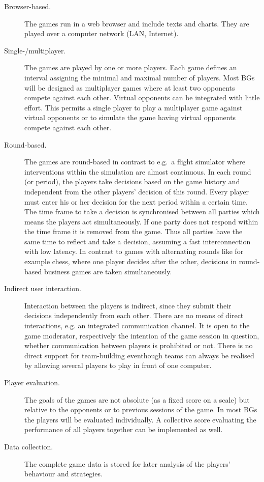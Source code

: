 \begin{description}
    \item[Browser-based.] The games run in a web browser and include texts and charts. They are played over a computer network (LAN, Internet).
    \item[Single-/multiplayer.] The games are played by one or more players. Each game defines an interval assigning the minimal and maximal number of players. Most BGs will be designed as multiplayer games where at least two opponents compete against each other. Virtual opponents can be integrated with little effort. This permits a single player to play a multiplayer game against virtual opponents or to simulate the game having virtual opponents compete against each other.
    \item[Round-based.] The games are round-based in contrast to e.g.~a flight simulator where interventions within the simulation are almost continuous. 
    In each round (or period), the players take decisions based on the game history and independent from the other players' decision of this round. Every player must enter his or her decision for the next period within a certain time. 
    The time frame to take a decision is synchronised between all parties which means the players act simultaneously. 
    If one party does not respond within the time frame it is removed from the game. Thus all parties have the same time to reflect and take a decision, assuming a fast interconnection with low latency.
    In contrast to games with alternating rounds like for example chess, where one player decides after the other, decisions in round-based business games are taken simultaneously.
    \item[Indirect user interaction.] Interaction between the players is indirect, since they submit their decisions independently from each other. There are no means of direct interactions, e.g. an integrated communication channel. It is open to the game moderator, respectively the intention of the game session in question, whether communication between players is prohibited or not. There is no direct support for team-building eventhough teams can always be realised by allowing several players to play in front of one computer.
    \item[Player evaluation.] 
    The goals of the games are not absolute (as a fixed score on a scale) but relative to the opponents or to previous sessions of the game. In most BGs the players will be evaluated individually. A collective score evaluating the performance of all players together can be implemented as well. 
    \item[Data collection.] The complete game data is stored for later analysis of the players' behaviour and strategies.
\end{description}

